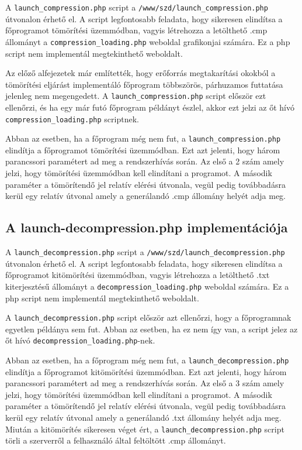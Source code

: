\documentclass[oneside,titlepage,12pt,a4paper]{report}
\begin{document}
A \texttt{launch\_compression.php} script a \texttt{/www/szd/launch\_compression.php} útvonalon érhető el. A script legfontosabb feladata, hogy sikeresen elindítsa a főprogramot tömörítési üzemmódban, vagyis létrehozza a letölthető .cmp állományt a \linebreak \texttt{compression\_loading.php} weboldal grafikonjai számára. Ez a php script nem implementál megtekinthető weboldalt.
\par Az előző alfejezetek már említették, hogy erőforrás megtakarítási okokból a tömörítési eljárást implementáló főprogram többszörös, párhuzamos futtatása jelenleg nem megengedett. A \texttt{launch\_compression.php} script először ezt ellenőrzi, és ha egy már futó főprogram példányt észlel, akkor ezt jelzi az őt hívó \texttt{compression\_loading.php} scriptnek.
\par Abban az esetben, ha a főprogram még nem fut, a \texttt{launch\_compression.php}  elindítja a főprogramot tömörítési üzemmódban. Ezt azt jelenti, hogy három parancssori paramétert ad meg a rendszerhívás során. Az első a 2 szám amely jelzi, hogy tömörítési üzemmódban kell elindítani a programot. A második paraméter a tömörítendő jel relatív elérési útvonala, vegül pedig továbbadásra kerül egy relatív útvonal amely a generálandó .cmp állomány helyét adja meg.

\subsection{A launch-decompression.php implementációja}

A \texttt{launch\_decompression.php} script a \texttt{/www/szd/launch\_decompression.php} útvonalon érhető el. A script legfontosabb feladata, hogy sikeresen elindítsa a főprogramot kitömörítési üzemmódban, vagyis létrehozza a letölthető .txt kiterjesztésű állományt a \texttt{decompression\_loading.php} weboldal számára. Ez a php script nem implementál megtekinthető weboldalt.
\par A \texttt{launch\_decompression.php} script először azt ellenőrzi, hogy a főprogramnak egyetlen példánya sem fut. Abban az esetben, ha ez nem így van, a script jelez az őt hívó \texttt{decompression\_loading.php}-nek. 
\par Abban az esetben, ha a főprogram még nem fut, a \texttt{launch\_decompression.php}  elindítja a főprogramot kitömörítési üzemmódban. Ezt azt jelenti, hogy három parancssori paramétert ad meg a rendszerhívás során. Az első a 3 szám amely jelzi, hogy tömörítési üzemmódban kell elindítani a programot. A második paraméter a tömörítendő jel relatív elérési útvonala, vegül pedig továbbadásra kerül egy relatív útvonal amely a generálandó .txt állomány helyét adja meg. Miután a kitömörítés sikeresen véget ért, a \texttt{launch\_decompression.php} script törli a szerverről a felhasználó által feltöltött .cmp állományt. 
\end{document}
